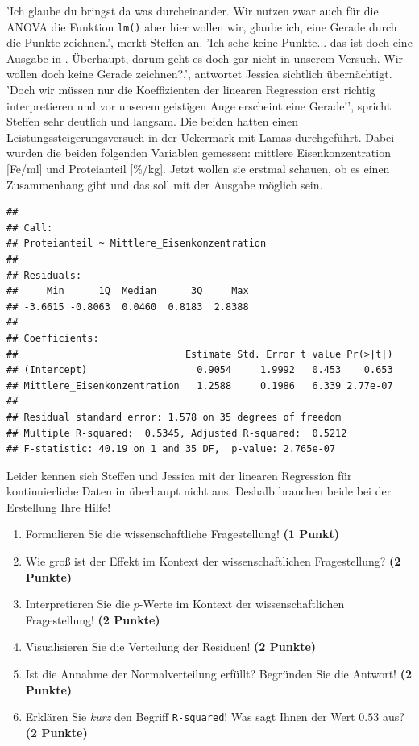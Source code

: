 \documentclass[a4paper, 9pt]{scrartcl}\usepackage[]{graphicx}\usepackage[]{xcolor}
\makeatletter
\newenvironment{kframe}{%
 \def\at@end@of@kframe{}%
 \ifinner\ifhmode%
  \def\at@end@of@kframe{\end{minipage}}%
  \begin{minipage}{\columnwidth}%
 \fi\fi%
 \def\FrameCommand##1{\hskip\@totalleftmargin \hskip-\fboxsep
 \colorbox{shadecolor}{##1}\hskip-\fboxsep
     \hskip-\linewidth \hskip-\@totalleftmargin \hskip\columnwidth}%
 \MakeFramed {\advance\hsize-\width
   \@totalleftmargin\z@ \linewidth\hsize
   \@setminipage}}%
 {\par\unskip\endMakeFramed%
 \at@end@of@kframe}
\newenvironment{knitrout}{}{} %
\makeatother
\begin{document}
'Ich glaube du bringst da was durcheinander. Wir nutzen zwar auch für die ANOVA die Funktion \texttt{lm()} aber hier wollen wir, glaube ich, eine Gerade durch die Punkte zeichnen.', merkt Steffen an. 'Ich sehe keine Punkte... das ist doch eine Ausgabe in \Rlogo. Überhaupt, darum geht es doch gar nicht in unserem Versuch. Wir wollen doch keine Gerade zeichnen?.', antwortet Jessica sichtlich übernächtigt. 'Doch wir müssen nur die Koeffizienten der linearen Regression erst richtig interpretieren und vor unserem geistigen Auge erscheint eine Gerade!', spricht Steffen sehr deutlich und langsam. Die beiden hatten einen Leistungssteigerungsversuch in der Uckermark mit Lamas durchgeführt. Dabei wurden die beiden folgenden Variablen gemessen: mittlere Eisenkonzentration [Fe/ml] und Proteianteil [\%/kg]. Jetzt wollen sie erstmal schauen, ob es einen Zusammenhang gibt und das soll mit der \Rlogo Ausgabe möglich sein.

\begin{knitrout}
\color{fgcolor}\begin{kframe}
\begin{verbatim}
## 
## Call:
## Proteianteil ~ Mittlere_Eisenkonzentration
## 
## Residuals:
##     Min      1Q  Median      3Q     Max 
## -3.6615 -0.8063  0.0460  0.8183  2.8388 
## 
## Coefficients:
##                             Estimate Std. Error t value Pr(>|t|)
## (Intercept)                   0.9054     1.9992   0.453    0.653
## Mittlere_Eisenkonzentration   1.2588     0.1986   6.339 2.77e-07
## 
## Residual standard error: 1.578 on 35 degrees of freedom
## Multiple R-squared:  0.5345,	Adjusted R-squared:  0.5212 
## F-statistic: 40.19 on 1 and 35 DF,  p-value: 2.765e-07
\end{verbatim}
\end{kframe}
\end{knitrout}

Leider kennen sich Steffen und Jessica mit der linearen Regression für kontinuierliche Daten in \Rlogo überhaupt nicht aus. Deshalb brauchen beide bei der Erstellung Ihre Hilfe!


\begin{enumerate}
\item Formulieren Sie die wissenschaftliche Fragestellung! \textbf{(1 Punkt)}
\item Wie groß ist der Effekt im Kontext der wissenschaftlichen Fragestellung? \textbf{(2 Punkte)} 
\item Interpretieren Sie die $p$-Werte im Kontext der wissenschaftlichen Fragestellung! \textbf{(2 Punkte)}
\item Visualisieren Sie die Verteilung der Residuen! \textbf{(2 Punkte)} 
\item Ist die Annahme der Normalverteilung erfüllt? Begründen Sie die Antwort! \textbf{(2 Punkte)}
\item Erklären Sie \textit{kurz} den Begriff \texttt{R-squared}! Was sagt Ihnen der Wert $0.53$ aus? \textbf{(2 Punkte)}
\end{enumerate}
 
\end{document}
